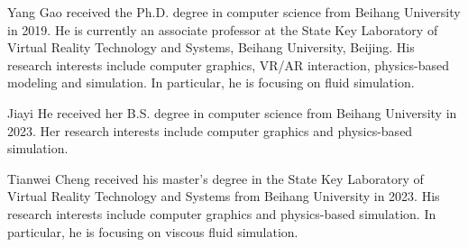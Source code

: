 \documentclass[10pt,journal,compsoc]{IEEEtran}
\begin{document}
  \vspace{-10 mm}
\begin{IEEEbiography}{Yang Gao} received the Ph.D. degree in computer science from Beihang University in 2019. He is currently an associate professor at the State Key Laboratory of Virtual Reality Technology and Systems, Beihang University, Beijing. His research interests include computer graphics, VR/AR interaction, physics-based modeling and simulation. In particular, he is focusing on fluid simulation. 
\end{IEEEbiography}   
\vspace{-10 mm}

 \vspace{-10 mm}
\begin{IEEEbiography}{Jiayi He} received her B.S. degree in computer science from Beihang University in 2023. Her research interests include computer graphics and physics-based simulation.
\end{IEEEbiography}
\vspace{-10 mm}


 \vspace{-10 mm}
\begin{IEEEbiography}{Tianwei Cheng} received his master's degree in the State Key Laboratory of Virtual Reality Technology and Systems from Beihang University in 2023. His research interests include computer graphics and physics-based simulation. In particular, he is focusing on viscous fluid simulation. 
\end{IEEEbiography}
\vspace{-10 mm}
\end{document}
